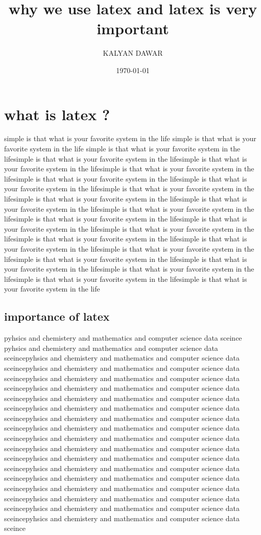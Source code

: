 \documentclass[12pt]{article}
\title{  why we use latex and latex is very important}
\author{ KALYAN DAWAR}
\date{\today}
\begin{document}
\maketitle
\tableofcontents
\clearpage
\section{what is latex ?}
simple is that what is your favorite system in the life  simple is that what is your favorite system in the life simple is that what is your favorite system in the lifesimple is that what is your favorite system in the lifesimple is that what is your favorite system in the lifesimple is that what is your favorite system in the lifesimple is that what is your favorite system in the lifesimple is that what is your favorite system in the lifesimple is that what is your favorite system in the lifesimple is that what is your favorite system in the lifesimple is that what is your favorite system in the lifesimple is that what is your favorite system in the lifesimple is that what is your favorite system in the lifesimple is that what is your favorite system in the lifesimple is that what is your favorite system in the lifesimple is that what is your favorite system in the lifesimple is that what is your favorite system in the lifesimple is that what is your favorite system in the lifesimple is that what is your favorite system in the lifesimple is that what is your favorite system in the lifesimple is that what is your favorite system in the lifesimple is that what is your favorite system in the lifesimple is that what is your favorite system in the life
\subsection{importance of latex}
pyhsics and chemistery and mathematics and computer science data sceince pyhsics and chemistery and mathematics and computer science data sceincepyhsics and chemistery and mathematics and computer science data sceincepyhsics and chemistery and mathematics and computer science data sceincepyhsics and chemistery and mathematics and computer science data sceincepyhsics and chemistery and mathematics and computer science data sceincepyhsics and chemistery and mathematics and computer science data sceincepyhsics and chemistery and mathematics and computer science data sceincepyhsics and chemistery and mathematics and computer science data sceincepyhsics and chemistery and mathematics and computer science data sceincepyhsics and chemistery and mathematics and computer science data sceincepyhsics and chemistery and mathematics and computer science data sceincepyhsics and chemistery and mathematics and computer science data sceincepyhsics and chemistery and mathematics and computer science data sceincepyhsics and chemistery and mathematics and computer science data sceincepyhsics and chemistery and mathematics and computer science data sceincepyhsics and chemistery and mathematics and computer science data sceincepyhsics and chemistery and mathematics and computer science data sceincepyhsics and chemistery and mathematics and computer science data sceince
\end{document}
